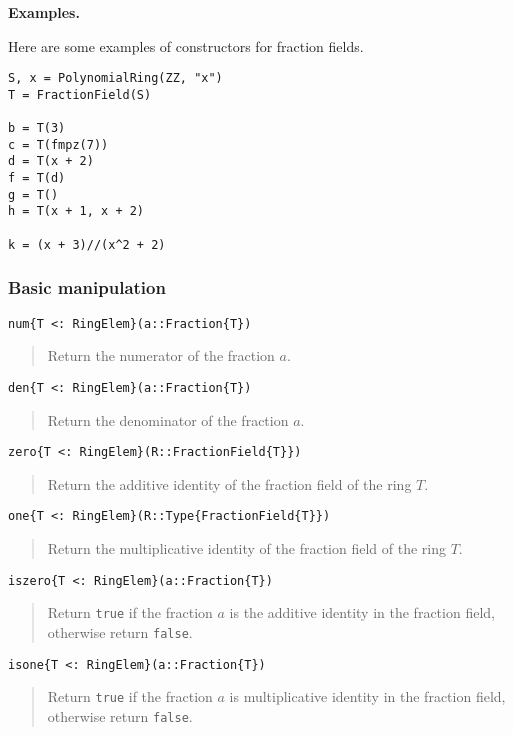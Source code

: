\documentclass[a4paper,10pt]{article}
\newcommand{\code}{\lstinline}
\newcommand{\desc}[1]{\vspace{-3mm}\begin{quote}#1\end{quote}}
\begin{document}
\textbf{Examples.}

Here are some examples of constructors for fraction fields.

\begin{lstlisting}
S, x = PolynomialRing(ZZ, "x")
T = FractionField(S)

b = T(3)
c = T(fmpz(7))
d = T(x + 2)
f = T(d)
g = T()
h = T(x + 1, x + 2)

k = (x + 3)//(x^2 + 2)
\end{lstlisting}

\subsubsection{Basic manipulation}

\begin{lstlisting}
num{T <: RingElem}(a::Fraction{T})
\end{lstlisting}

\desc{Return the numerator of the fraction $a$.}

\begin{lstlisting}
den{T <: RingElem}(a::Fraction{T})
\end{lstlisting}

\desc{Return the denominator of the fraction $a$.}

\begin{lstlisting}
zero{T <: RingElem}(R::FractionField{T}})
\end{lstlisting}

\desc{Return the additive identity of the fraction field of the ring $T$.}

\begin{lstlisting}
one{T <: RingElem}(R::Type{FractionField{T}})
\end{lstlisting}

\desc{Return the multiplicative identity of the fraction field of the ring 
$T$.}

\begin{lstlisting}
iszero{T <: RingElem}(a::Fraction{T})
\end{lstlisting}

\desc{Return \code{true} if the fraction $a$ is the additive identity in the
fraction field, otherwise return \code{false}.}

\begin{lstlisting}
isone{T <: RingElem}(a::Fraction{T})
\end{lstlisting}

\desc{Return \code{true} if the fraction $a$ is multiplicative identity in the
fraction field, otherwise return \code{false}.}
\end{document}
